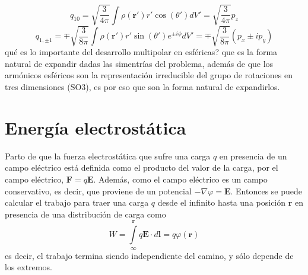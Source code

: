 \begin{equation*}
    q_{10} = \sqrt{\frac{3}{4\pi}}\int\rho(\textbf{r}')r'\cos{(\theta')}dV'
    = \sqrt{\frac{3}{4\pi}}p_{z}
\end{equation*}
\begin{equation*}
    q_{1,\pm1} =\mp \sqrt{\frac{3}{8\pi}} \int\rho(\textbf{r}')r'\sin{(\theta')}e^{\pm i \phi}dV'
    = \mp \sqrt{\frac{3}{8\pi}}(p_{x}\pm ip_{y})
\end{equation*}
qué es lo importante del desarrollo multipolar en esféricas? que es la forma natural de expandir dadas las simentrías del problema, además de que los armónicos esféricos son la representación irreducible del grupo de rotaciones en tres dimensiones (SO3), es por eso que son la forma natural de expandirlos.



\newpage
\section{Energía electrostática}
Parto de que la fuerza electrostática que sufre una carga $q$ en presencia de un campo eléctrico está definida como el producto del valor de la carga, por el campo eléctrico, $\textbf{F} = q \textbf{E}$. Además, como el campo eléctrico es un campo conservativo, es decir, que proviene de un potencial $-\nabla \varphi = \textbf{E}$. Entonces se puede calcular el trabajo para traer una carga $q$ desde el infinito hasta una posición $\textbf{r}$ en presencia de una distribución de carga como
\begin{equation*}
    W = \int\limits_{\infty}^{\textbf{r}}q\textbf{E}\cdot d\textbf{l} = q\varphi(\textbf{r})
\end{equation*}
es decir, el trabajo termina siendo independiente del camino, y sólo depende de los extremos.




